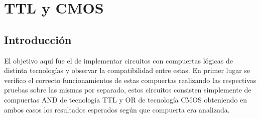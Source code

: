 \chapter{TTL y CMOS}


\section{Introducción}
El objetivo aquí fue el de implementar circuitos con compuertas lógicas de distinta tecnologías y observar la compatibilidad entre estas. 
En primer lugar se verifico el correcto funcionamientos de estas compuertas realizando las respectivas pruebas sobre las mismas por separado, estos circuitos consisten simplemente de compuertas AND de tecnología TTL y OR de tecnología CMOS obteniendo en ambos casos los resultados esperados según que compuerta era analizada.
